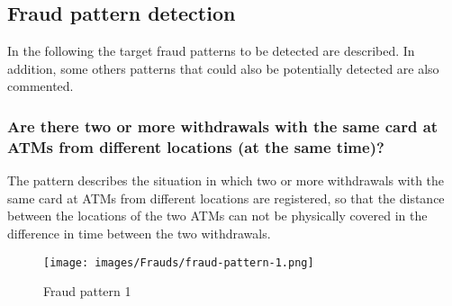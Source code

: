 \subsection{Fraud pattern detection}

In the following the target fraud patterns to be detected are described. In addition, some others patterns that could also be potentially detected are also commented.

\begin{comment}
TODO: Comentar sobre la naturaleza del sistema que estamos diseñando
-------------------------
El sistema que estamos diseñando es orientado a detección y alerta de fraude sobre transacciones YA REALIZADAS!

NO sobre intentos de transacciones! (preventivo)

Se podría escalar a ello para evitar la realización de transacciones que fuesen detectadas como posibles fraudes, sin embargo esto complicaría la gestión de los filtros ya que:

1. filtro detectaría posible fraude; transacción tentativa quedaría en espera
2. filtro tendría que recibir de vuelta del sistema bancario si al final se autorizó, a pesar de la alerta, esa transacción o no, para poder eliminarla / limpiar el filtro.
Si esto no sucediera así entonces en el caso de que no se autorizara finalmente la transacción tentativa podríamos estar teniendo en el filtro una "falsa transacción" y por tanto estar causando conflictos o generando nuevas alertas que no deberían de estar generándose por culpa de no haber limpiado el filtro de esta transacción no realizada.
-------------------------
\end{comment}

\subsubsection{Are there two or more withdrawals with the same card at ATMs from different locations (at the same time)?}\label{fraud-pattern-1}



The pattern describes the situation in which two or more withdrawals with the same card at ATMs from different locations are registered, so that the distance between the locations of the two ATMs can not be physically covered in the difference in time between the two withdrawals.

\begin{figure}[H]
    \centering
    \texttt{[image: images/Frauds/fraud-pattern-1.png]}
    \caption{Fraud pattern 1}
    \label{img:fraud-pattern-1}
\end{figure}

